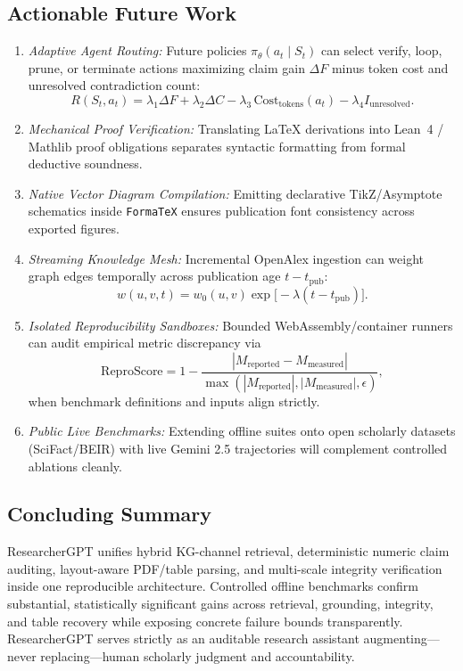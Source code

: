 \documentclass[conference]{IEEEtran}
\begin{document}
\subsection{Actionable Future Work}
\begin{enumerate}
  \item \emph{Adaptive Agent Routing:} Future policies $\pi_\theta(a_t \mid S_t)$ can select verify, loop, prune, or terminate actions maximizing claim gain $\Delta F$ minus token cost and unresolved contradiction count:
  \begin{equation}
  R(S_t, a_t) = \lambda_1\Delta F + \lambda_2\Delta C - \lambda_3\,\text{Cost}_{\text{tokens}}(a_t) - \lambda_4 I_{\text{unresolved}}.
  \end{equation}
  \item \emph{Mechanical Proof Verification:} Translating LaTeX derivations into Lean~4 / Mathlib proof obligations separates syntactic formatting from formal deductive soundness.
  \item \emph{Native Vector Diagram Compilation:} Emitting declarative TikZ/Asymptote schematics inside \texttt{FormaTeX} ensures publication font consistency across exported figures.
  \item \emph{Streaming Knowledge Mesh:} Incremental OpenAlex ingestion can weight graph edges temporally across publication age $t - t_{\text{pub}}$:
  \begin{equation}
  w(u, v, t) = w_0(u, v)\exp\!\big[-\lambda(t - t_{\text{pub}})\big].
  \end{equation}
  \item \emph{Isolated Reproducibility Sandboxes:} Bounded WebAssembly/container runners can audit empirical metric discrepancy via
  \begin{equation}
  \text{ReproScore} = 1 - \frac{|M_{\text{reported}} - M_{\text{measured}}|}{\max(|M_{\text{reported}}|, |M_{\text{measured}}|, \epsilon)},
  \end{equation}
  when benchmark definitions and inputs align strictly.
  \item \emph{Public Live Benchmarks:} Extending offline suites onto open scholarly datasets (SciFact/BEIR) with live Gemini 2.5 trajectories will complement controlled ablations cleanly.
\end{enumerate}

\subsection{Concluding Summary}
ResearcherGPT unifies hybrid KG-channel retrieval, deterministic numeric claim auditing, layout-aware PDF/table parsing, and multi-scale integrity verification inside one reproducible architecture. Controlled offline benchmarks confirm substantial, statistically significant gains across retrieval, grounding, integrity, and table recovery while exposing concrete failure bounds transparently. ResearcherGPT serves strictly as an auditable research assistant augmenting---never replacing---human scholarly judgment and accountability.
\end{document}

